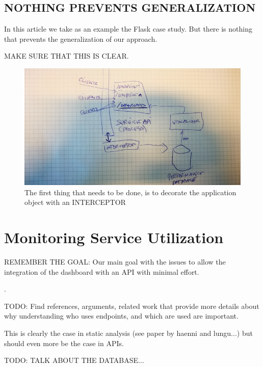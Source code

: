 \documentclass[conference]{IEEEtran}
\begin{document}
\subsection*{NOTHING PREVENTS GENERALIZATION}
In this article we take as an example the Flask case study.
But there is nothing that prevents the generalization of 
our approach. 

MAKE SURE THAT THIS IS CLEAR.




    \begin{figure}[ht!]
      \centering
      \includegraphics[width=0.8\linewidth]{interceptor}
      \caption{The first thing that needs to be done, is to decorate the application object with an INTERCEPTOR}
      \label{fig:sep}
    \end{figure}

\newpage

\section{Monitoring Service Utilization}

REMEMBER THE GOAL: Our main goal with the \tool issues to allow the integration of the dashboard with an API with minimal effort.




. 

TODO: Find references, arguments, related work
that provide more details about why understanding
who uses endpoints, and which are used are important.

This is clearly the case in static analysis (see paper
by haenni and lungu...) but should even more be the
case in APIs.




  \newpage
TODO: TALK ABOUT THE DATABASE...
\end{document}
